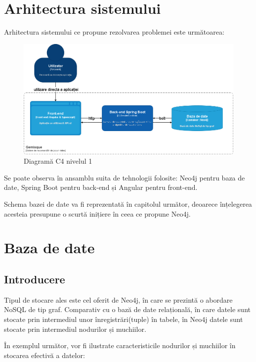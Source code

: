 \documentclass[12pt,a4paper]{report}
\begin{document}
\newpage

\section{Arhitectura sistemului}

Arhitectura sistemului ce propune rezolvarea problemei este următoarea:

\begin{figure}[H]
\centering
\caption{}
\includegraphics[scale = 0.5]{exemplu_17_diagrama_c4_nivel_1.drawio}
\caption*{Diagramă C4 nivelul 1}
\end{figure}

Se poate observa în ansamblu suita de tehnologii folosite: Neo4j pentru baza de date, Spring Boot pentru back-end și Angular pentru front-end.

Schema bazei de date va fi reprezentată în capitolul următor, deoarece înțelegerea acesteia presupune o scurtă inițiere în ceea ce propune Neo4j.

\newpage


\section{Baza de date}
\subsection{Introducere}

Tipul de stocare ales este cel oferit de Neo4j, în care se prezintă o abordare NoSQL de tip graf.  Comparativ cu o bază de date relațională, în care datele sunt stocate prin intermediul unor înregistrări(tuple) în tabele, în Neo4j datele sunt stocate prin intermediul nodurilor și muchiilor.

În exemplul următor, vor fi ilustrate caracteristicile nodurilor și muchiilor în stocarea efectivă a datelor:
\end{document}
